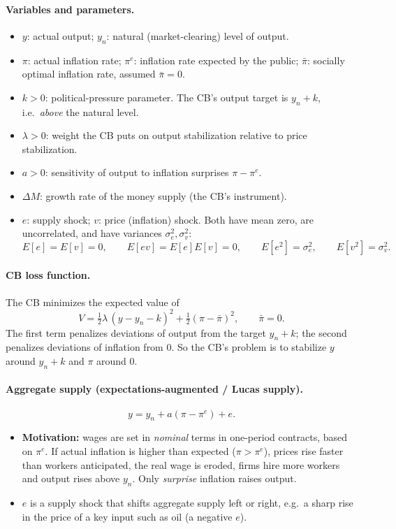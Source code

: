 \paragraph{Variables and parameters.}
\begin{itemize}
  \item $y$: actual output; $y_n$: natural (market-clearing) level of output.
  \item $\pi$: actual inflation rate; $\pi^e$: inflation rate expected by the public; $\bar\pi$: socially optimal inflation rate, assumed $\bar\pi=0$.
  \item $k>0$: political-pressure parameter. The CB's output target is $y_n+k$, i.e.\ \emph{above} the natural level.
  \item $\lambda>0$: weight the CB puts on output stabilization relative to price stabilization.
  \item $a>0$: sensitivity of output to inflation surprises $\pi-\pi^e$.
  \item $\Delta M$: growth rate of the money supply (the CB's instrument).
  \item $e$: supply shock; $v$: price (inflation) shock. Both have mean zero, are uncorrelated, and have variances $\sigma_e^2,\sigma_v^2$:
  \[
  E[e]=E[v]=0,\qquad E[ev]=E[e]E[v]=0,\qquad E[e^2]=\sigma_e^2,\qquad E[v^2]=\sigma_v^2 .
  \]
\end{itemize}

\paragraph{CB loss function.} The CB minimizes the expected value of
\begin{equation}
V=\tfrac12\lambda\,(y-y_n-k)^2+\tfrac12(\pi-\bar\pi)^2,\qquad \bar\pi=0 .\label{eq:bg-loss}
\end{equation}
The first term penalizes deviations of output from the target $y_n+k$; the second penalizes deviations of inflation from $0$. So the CB's problem is to stabilize $y$ around $y_n+k$ and $\pi$ around $0$.

\paragraph{Aggregate supply (expectations-augmented / Lucas supply).}
\begin{equation}
y=y_n+a(\pi-\pi^e)+e .\label{eq:bg-as}
\end{equation}
\begin{itemize}
  \item \textbf{Motivation:} wages are set in \emph{nominal} terms in one-period contracts, based on $\pi^e$. If actual inflation is higher than expected ($\pi>\pi^e$), prices rise faster than workers anticipated, the real wage is eroded, firms hire more workers and output rises above $y_n$. Only \emph{surprise} inflation raises output.
  \item $e$ is a supply shock that shifts aggregate supply left or right, e.g.\ a sharp rise in the price of a key input such as oil (a negative $e$).
\end{itemize}

